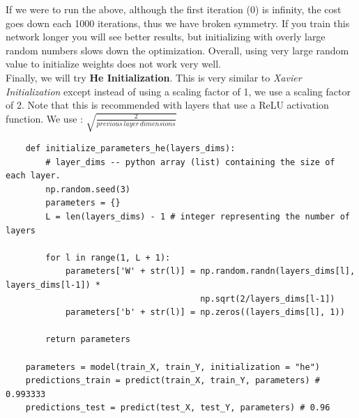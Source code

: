 \documentclass[11pt, a4paper]{article}
\begin{document}
\begin{spacing}{1.1}
\begin{minipage}[c]{8.5cm}
	\end{minipage} \vspace*{2mm} \newline
	If we were to run the above, although the first iteration (0) is infinity, the cost goes down each 1000 iterations, thus we have broken symmetry. If you train this network longer you will see better results, but initializing with overly large random numbers slows down the optimization. Overall, using very large random value to initialize weights does not work very well. \vspace*{3mm} \\
	Finally, we will try \textbf{He Initialization}. This is very similar to \textit{Xavier Initialization} except instead of using a scaling factor of 1, we use a scaling factor of 2. Note that this is recommended with layers that use a ReLU activation function. We use : $\sqrt{\frac{2}{previous\, layer\, dimensions}}	$
	\begin{lstlisting}
	def initialize_parameters_he(layers_dims):
		# layer_dims -- python array (list) containing the size of each layer.
		np.random.seed(3)
		parameters = {}
		L = len(layers_dims) - 1 # integer representing the number of layers
		
		for l in range(1, L + 1):
			parameters['W' + str(l)] = np.random.randn(layers_dims[l], layers_dims[l-1]) * 
			                           np.sqrt(2/layers_dims[l-1])
			parameters['b' + str(l)] = np.zeros((layers_dims[l], 1))
		
		return parameters
		
	parameters = model(train_X, train_Y, initialization = "he")
	predictions_train = predict(train_X, train_Y, parameters) # 0.993333
	predictions_test = predict(test_X, test_Y, parameters) # 0.96
	

\end{lstlisting}
\end{spacing}
\end{document}
